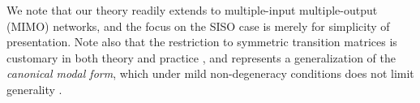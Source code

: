 We note that our theory readily extends to multiple-input multiple-output (MIMO) networks, and the focus on the SISO case is merely for simplicity of presentation.
Note also that the restriction to symmetric transition matrices is customary in both theory \citep{hazan2018spectral} and practice \citep{gupta2022diagonal}, and represents a generalization of the \emph{canonical modal form}, which under mild non-degeneracy conditions does not limit generality \citep{boyd2006ee263}.

